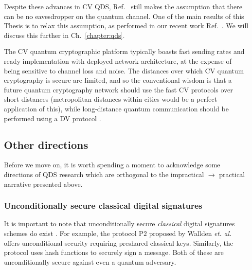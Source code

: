 Despite these advances in CV QDS, Ref.~\cite{Croal2016} still makes the assumption that there can be no eavesdropper on the quantum channel. One of the main results of this Thesis is to relax this assumption, as performed in our recent work Ref.~\cite{Thornton2019}. We will discuss this further in Ch.~\ref{chapter:qds}.

The CV quantum cryptographic platform typically boasts fast sending rates and ready implementation with deployed network architecture, at the expense of being sensitive to channel loss and noise. The distances over which CV quantum cryptography is secure are limited, and so the conventional wisdom is that a future quantum cryptography network should use the fast CV protocols over short distances (metropolitan distances within cities would be a perfect application of this), while long-distance quantum communication should be performed using a DV protocol \cite{Pirandola2015a}. %



\subsection{Other directions}


%
%

Before we move on, it is worth spending a moment to acknowledge some directions of QDS research which are orthogonal to the impractical $\rightarrow$ practical narrative presented above.


\subsubsection*{Unconditionally secure classical digital signatures}
It is important to note that unconditionally secure \emph{classical} digital signatures schemes do exist \cite{Wallden2015, Amiri2016a, Hanaoka2000}. For example, the protocol P$2$ proposed by Wallden \emph{et. al.} \cite{Wallden2015} offers unconditional security requiring preshared classical keys. Similarly, the protocol \cite{Amiri2016a} uses hash functions to securely sign a message. %
Both of these are unconditionally secure against even a quantum adversary.

